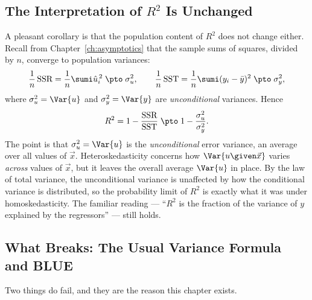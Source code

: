 \subsection{The Interpretation of $R^2$ Is Unchanged}

A pleasant corollary is that the population content of $R^2$ does not change either. Recall from Chapter~\ref{ch:asymptotics} that the sample sums of squares, divided by $n$, converge to population variances:
\[
\frac1n\,\text{SSR} = \frac1n\sumi \hat u_i^{\,2} \;\pto\; \sigma_u^2,
\qquad
\frac1n\,\text{SST} = \frac1n\sumi (y_i-\bar y)^2 \;\pto\; \sigma_y^2,
\]
where $\sigma_u^2 = \Var{u}$ and $\sigma_y^2 = \Var{y}$ are \emph{unconditional} variances. Hence
\[
R^2 = 1 - \frac{\text{SSR}}{\text{SST}} \;\pto\; 1 - \frac{\sigma_u^2}{\sigma_y^2}.
\]
The point is that $\sigma_u^2 = \Var{u}$ is the \emph{unconditional} error variance, an average over all values of $\vec x$. Heteroskedasticity concerns how $\Var{u \given \vec x}$ varies \emph{across} values of $\vec x$, but it leaves the overall average $\Var{u}$ in place. By the law of total variance, the unconditional variance is unaffected by how the conditional variance is distributed, so the probability limit of $R^2$ is exactly what it was under homoskedasticity. The familiar reading --- ``$R^2$ is the fraction of the variance of $y$ explained by the regressors'' --- still holds.

\subsection{What Breaks: The Usual Variance Formula and BLUE}

Two things do fail, and they are the reason this chapter exists.


